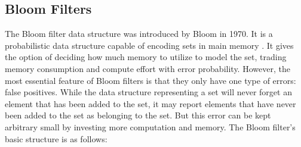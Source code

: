 \documentclass[sigconf]{acmart}
\begin{document}
%

\subsection{Bloom Filters}

The Bloom filter data structure was introduced by Bloom in 1970. It is a probabilistic data structure capable of encoding sets in main memory \cite{bloom_space/time_1970}. It gives the option of deciding how much memory to utilize to model the set, trading memory consumption and compute effort with error probability. However, the most essential feature of Bloom filters is that they only have one type of errors: false positives. While the data structure representing a set will never forget an element that has been added to the set, it may report elements that have never been added to the set as belonging to the set. But this error can be kept arbitrary small by investing more computation and memory. The Bloom filter's basic structure is as follows:
\end{document}
